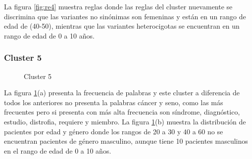 La figura \ref{fig:re4} muestra reglas  donde las reglas del cluster nuevamente se discrimina que las variantes no sinónimas son femeninas y están en un rango de edad de (40-50), mientras que las variantes heterocigotas se encuentran en un rango de edad de 0 a 10 años. 

\subsubsection*{Cluster 5}

\begin{figure}[H]
	\centering
	\caption{Cluster 5} \label{fig:c5}
\end{figure}

La figura \ref{fig:c5}(a) presenta la frecuencia de palabras y este cluster a diferencia de todos los anteriores no presenta la palabras cáncer y seno, como las más frecuentes pero si presenta con más alta frecuencia son síndrome, diagnóstico, estudio, distrofia, requiere y miembro. La figura \ref{fig:c5}(b) muestra la distribución de pacientes por edad y género donde los rangos de 20 a 30 y 40 a 60 no se encuentran pacientes de género masculino, aunque tiene 10 pacientes masculinos en el rango de edad de 0 a 10 años.

